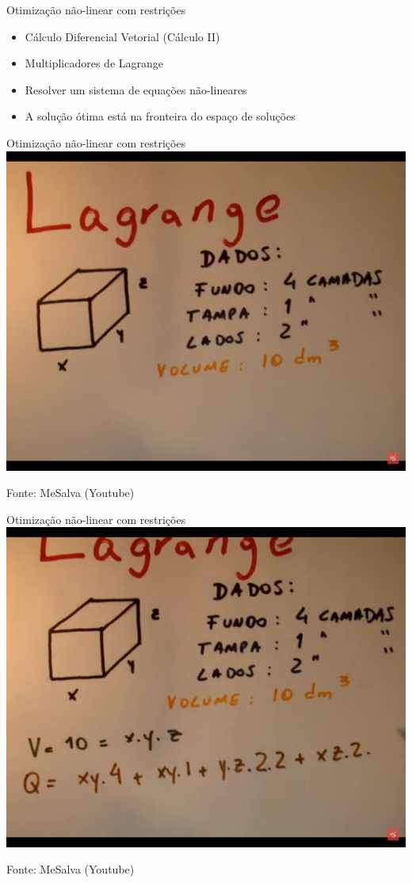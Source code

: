 \documentclass{beamer}
\begin{document}
\begin{frame}{Otimização não-linear com restrições}
  \begin{itemize}
  \item Cálculo Diferencial Vetorial (Cálculo II)
  \item Multiplicadores de Lagrange
  \item Resolver um sistema de equações não-lineares
  \item A solução ótima está na fronteira do espaço de soluções
  \end{itemize}
\end{frame}

\begin{frame}{Otimização não-linear com restrições}
  \centering
  \includegraphics[height=.8\textheight]{otimizacao/lagrange1}

\vfill
Fonte: MeSalva (Youtube)
\end{frame}

\begin{frame}{Otimização não-linear com restrições}
  \centering
  \includegraphics[height=.8\textheight]{otimizacao/lagrange2}

\vfill
Fonte: MeSalva (Youtube)
\end{frame}
\end{document}
